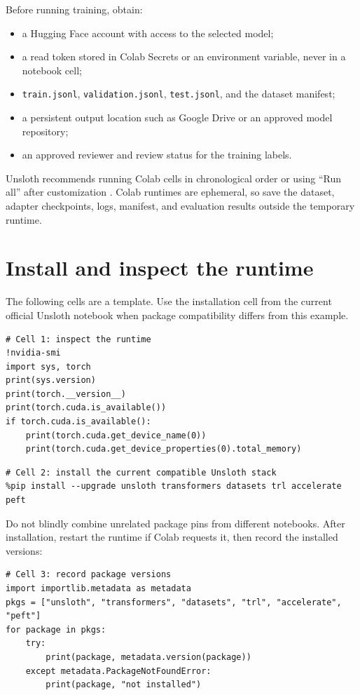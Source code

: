 \documentclass[11pt,oneside]{book}
\begin{document}
Before running training, obtain:

\begin{itemize}
\item a Hugging Face account with access to the selected model;
\item a read token stored in Colab Secrets or an environment variable, never in a notebook cell;
\item \texttt{train.jsonl}, \texttt{validation.jsonl}, \texttt{test.jsonl}, and the dataset manifest;
\item a persistent output location such as Google Drive or an approved model repository;
\item an approved reviewer and review status for the training labels.
\end{itemize}

Unsloth recommends running Colab cells in chronological order or using ``Run all'' after customization \cite{ref216}. Colab runtimes are ephemeral, so save the dataset, adapter checkpoints, logs, manifest, and evaluation results outside the temporary runtime.

\section{Install and inspect the runtime}

The following cells are a template. Use the installation cell from the current official Unsloth notebook when package compatibility differs from this example.

\begin{verbatim}
# Cell 1: inspect the runtime
!nvidia-smi
import sys, torch
print(sys.version)
print(torch.__version__)
print(torch.cuda.is_available())
if torch.cuda.is_available():
    print(torch.cuda.get_device_name(0))
    print(torch.cuda.get_device_properties(0).total_memory)
\end{verbatim}

\begin{verbatim}
# Cell 2: install the current compatible Unsloth stack
%pip install --upgrade unsloth transformers datasets trl accelerate peft
\end{verbatim}

Do not blindly combine unrelated package pins from different notebooks. After installation, restart the runtime if Colab requests it, then record the installed versions:

\begin{verbatim}
# Cell 3: record package versions
import importlib.metadata as metadata
pkgs = ["unsloth", "transformers", "datasets", "trl", "accelerate", "peft"]
for package in pkgs:
    try:
        print(package, metadata.version(package))
    except metadata.PackageNotFoundError:
        print(package, "not installed")
\end{verbatim}
\end{document}
